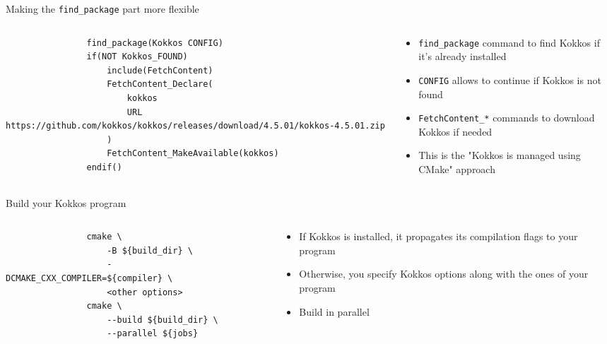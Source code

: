 \documentclass[aspectratio=169]{beamer}
\begin{document}
\begin{frame}[fragile]{Making the \texttt{find\_package} part more flexible}
    \begin{columns}
        \begin{column}{0.6\linewidth}
            \begin{verbatim}
                find_package(Kokkos CONFIG)
                if(NOT Kokkos_FOUND)
                    include(FetchContent)
                    FetchContent_Declare(
                        kokkos
                        URL https://github.com/kokkos/kokkos/releases/download/4.5.01/kokkos-4.5.01.zip
                    )
                    FetchContent_MakeAvailable(kokkos)
                endif()
            \end{verbatim}
        \end{column}
        \begin{column}{0.4\linewidth}
            \begin{itemize}
                \item \texttt{find\_package} command to find Kokkos if it's already installed
                \item \texttt{CONFIG} allows to continue if Kokkos is not found
                \item \texttt{FetchContent\_*} commands to download Kokkos if needed
                \item This is the "Kokkos is managed using CMake" approach
            \end{itemize}
        \end{column}
    \end{columns}
\end{frame}


\begin{frame}[fragile]{Build your Kokkos program}
    \begin{columns}
        \begin{column}{0.6\linewidth}
            \begin{verbatim}
                cmake \
                    -B ${build_dir} \
                    -DCMAKE_CXX_COMPILER=${compiler} \
                    <other options>
                cmake \
                    --build ${build_dir} \
                    --parallel ${jobs}
            \end{verbatim}
        \end{column}
        \begin{column}{0.4\linewidth}
            \begin{itemize}
                \item If Kokkos is installed, it propagates its compilation flags to your program
                \item Otherwise, you specify Kokkos options along with the ones of your program
                \item Build in parallel
            \end{itemize}
        \end{column}
    \end{columns}
\end{frame}
\end{document}
